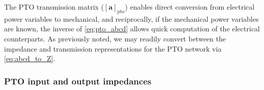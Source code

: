 \documentclass[lettersize,journal]{IEEEtran}
\begin{document}

%
The PTO transmission matrix ($\left[ \mathbf{a} \right]_{\textrm{pto}}$) enables direct conversion from electrical power variables to mechanical, and reciprocally, if the mechanical power variables are known, the inverse of \eqref{eq:pto_abcd} allows quick computation of the electrical counterparts.
As previously noted, we may readily convert between the impedance and transmission representations for the PTO network via \eqref{eq:abcd_to_Z}.


\subsubsection{PTO input and output impedances}\label{sec:pto_input_and_output_impedances}
\end{document}
